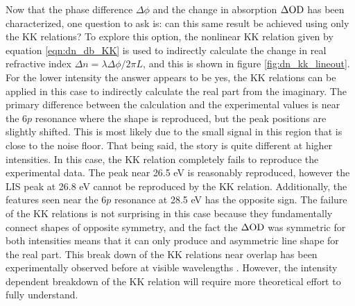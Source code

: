 Now that the phase difference $\Delta\phi$ and the change in absorption $\Delta\mathrm{OD}$ has been characterized, one question to ask is: can this same result be achieved using only the KK relations? To explore this option, the nonlinear KK relation given by equation \ref{eqn:dn_db_KK} is used to indirectly calculate the change in real refractive index $\Delta n = \lambda \Delta\phi/2\pi L$, and this is shown in figure \ref{fig:dn_kk_lineout}.  For the lower intensity the answer appears to be yes, the KK relations can be applied in this case to indirectly calculate the real part from the imaginary.  The primary difference between the calculation and the experimental values is near the $6p$ resonance where the shape is reproduced, but the peak positions are slightly shifted.  This is most likely due to the small signal in this region that is close to the noise floor.  That being said, the story is quite different at higher intensities.  In this case, the KK relation completely fails to reproduce the experimental data.  The peak near 26.5 eV is reasonably reproduced, however the LIS peak at 26.8 eV cannot be reproduced by the KK relation.  Additionally, the features seen near the $6p$ resonance at 28.5 eV has the opposite sign.  The failure of the KK relations is not surprising in this case because they fundamentally connect shapes of opposite symmetry, and the fact the $\Delta\mathrm{OD}$ was symmetric for both intensities means that it can only produce and asymmetric line shape for the real part.  This break down of the KK relations near overlap has been experimentally observed before at visible wavelengths \cite{tokunagaFemtosecondTimeresolvedDispersion1993}.  However, the intensity dependent breakdown of the KK relation will require more theoretical effort to fully understand.

